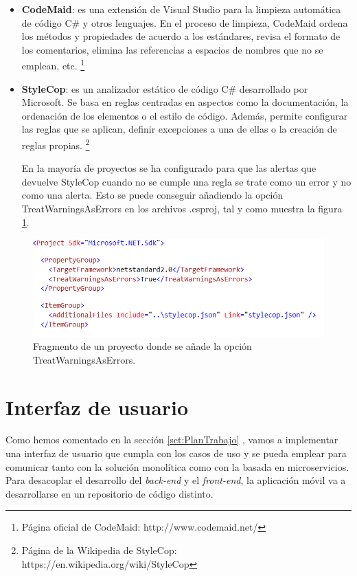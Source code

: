 \documentclass[11pt,spanish,listoffigures]{tfgetsinf}
\begin{document}
\begin{itemize}

\item \textbf{CodeMaid}: es una extensión de Visual Studio para la limpieza automática de código C\# y otros lenguajes. En el proceso de limpieza, CodeMaid ordena los métodos y propiedades de acuerdo a los estándares, revisa el formato de los comentarios, elimina las referencias a espacios de nombres que no se emplean, etc. \footnote{ Página oficial de CodeMaid: http://www.codemaid.net/}

\item \textbf{StyleCop}: es un analizador estático de código C\# desarrollado por Microsoft. Se basa en reglas centradas en aspectos como la documentación, la ordenación de los elementos o el estilo de código. Además, permite configurar las reglas que se aplican, definir excepciones a una de ellas o la creación de reglas propias. \footnote{Página de la Wikipedia de StyleCop: https://en.wikipedia.org/wiki/StyleCop} 

En la mayoría de proyectos se ha configurado para que las alertas que devuelve StyleCop cuando no se cumple una regla se trate como un error y no como una alerta. Esto se puede conseguir añadiendo la opción TreatWarningsAsErrors en los archivos .csproj, tal y como muestra la figura \ref{fig:TreatWarning}.

\end{itemize}

\begin{figure}[h]
\centering
\includegraphics[scale=0.9]{TreatWarning}
\caption{Fragmento de un proyecto donde se añade la opción TreatWarningsAsErrors.}
\label{fig:TreatWarning}
\end{figure}

\section{Interfaz de usuario}

Como hemos comentado en la sección \ref{sct:PlanTrabajo} , vamos a implementar una interfaz de usuario que cumpla con los casos de uso y se pueda emplear para comunicar tanto con la solución monolítica como con la basada en microservicios. Para desacoplar el desarrollo del \textit{back-end} y el \textit{front-end}, la aplicación móvil va a desarrollarse en un repositorio de código distinto.
\end{document}
